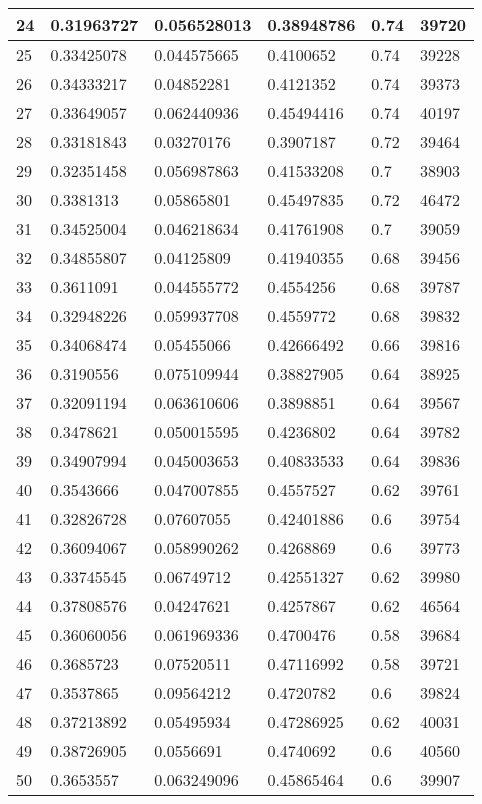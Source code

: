 \begin{longtable}{|l|l|l|l|l|l|}
24 & 0.31963727 & 0.056528013 & 0.38948786 & 0.74 & 39720 \\ \hline 
25 & 0.33425078 & 0.044575665 & 0.4100652 & 0.74 & 39228 \\ \hline 
26 & 0.34333217 & 0.04852281 & 0.4121352 & 0.74 & 39373 \\ \hline 
27 & 0.33649057 & 0.062440936 & 0.45494416 & 0.74 & 40197 \\ \hline 
28 & 0.33181843 & 0.03270176 & 0.3907187 & 0.72 & 39464 \\ \hline 
29 & 0.32351458 & 0.056987863 & 0.41533208 & 0.7 & 38903 \\ \hline 
30 & 0.3381313 & 0.05865801 & 0.45497835 & 0.72 & 46472 \\ \hline 
31 & 0.34525004 & 0.046218634 & 0.41761908 & 0.7 & 39059 \\ \hline 
32 & 0.34855807 & 0.04125809 & 0.41940355 & 0.68 & 39456 \\ \hline 
33 & 0.3611091 & 0.044555772 & 0.4554256 & 0.68 & 39787 \\ \hline 
34 & 0.32948226 & 0.059937708 & 0.4559772 & 0.68 & 39832 \\ \hline 
35 & 0.34068474 & 0.05455066 & 0.42666492 & 0.66 & 39816 \\ \hline 
36 & 0.3190556 & 0.075109944 & 0.38827905 & 0.64 & 38925 \\ \hline 
37 & 0.32091194 & 0.063610606 & 0.3898851 & 0.64 & 39567 \\ \hline 
38 & 0.3478621 & 0.050015595 & 0.4236802 & 0.64 & 39782 \\ \hline 
39 & 0.34907994 & 0.045003653 & 0.40833533 & 0.64 & 39836 \\ \hline 
40 & 0.3543666 & 0.047007855 & 0.4557527 & 0.62 & 39761 \\ \hline 
41 & 0.32826728 & 0.07607055 & 0.42401886 & 0.6 & 39754 \\ \hline 
42 & 0.36094067 & 0.058990262 & 0.4268869 & 0.6 & 39773 \\ \hline 
43 & 0.33745545 & 0.06749712 & 0.42551327 & 0.62 & 39980 \\ \hline 
44 & 0.37808576 & 0.04247621 & 0.4257867 & 0.62 & 46564 \\ \hline 
45 & 0.36060056 & 0.061969336 & 0.4700476 & 0.58 & 39684 \\ \hline 
46 & 0.3685723 & 0.07520511 & 0.47116992 & 0.58 & 39721 \\ \hline 
47 & 0.3537865 & 0.09564212 & 0.4720782 & 0.6 & 39824 \\ \hline 
48 & 0.37213892 & 0.05495934 & 0.47286925 & 0.62 & 40031 \\ \hline 
49 & 0.38726905 & 0.0556691 & 0.4740692 & 0.6 & 40560 \\ \hline 
50 & 0.3653557 & 0.063249096 & 0.45865464 & 0.6 & 39907 \\ \hline 
\end{longtable}